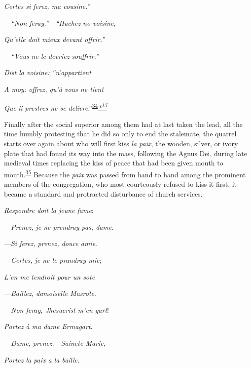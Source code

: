 \emph{Certes si ferez, ma cousine.''}

---\emph{``Non feray.''}---\emph{``Huchez no voisine},

\emph{Qu'elle doit mieux devant offrir.''}

---\emph{``Vous ne le devriez souffrir.''}

\emph{Dist la voisine: ``n'appartient}

\emph{A moy: offrez, qu'à vous ne tient}

\emph{Que li prestres ne se
delivre}.''\textsuperscript{\protect\hypertarget{09_Chapter_Two__THE_CRAVING_FOR_A_M.xhtmlux5cux23id_2019}{\protect\hyperlink{23_NOTES.xhtmlux5cux23id_2020}{34}}}\emph{\protect\hypertarget{09_Chapter_Two__THE_CRAVING_FOR_A_M.xhtmlux5cux23id_2437}{\protect\hyperlink{23_NOTES.xhtmlux5cux23id_2438}{*\textsuperscript{15}}}}

Finally after the social superior among them had at last taken the lead,
all the time humbly protesting that he did so only to end the stalemate,
the quarrel starts over again about who will first kiss \emph{la paix},
the wooden, silver, or ivory plate that had found its way into the mass,
following the Agnus Dei, during late medieval times replacing the kiss
of peace that had been given mouth to
mouth.\textsuperscript{\protect\hypertarget{09_Chapter_Two__THE_CRAVING_FOR_A_M.xhtmlux5cux23id_2017}{\protect\hyperlink{23_NOTES.xhtmlux5cux23id_2018}{35}}}
Because the \emph{paix} was passed from hand to hand among the prominent
members of the congregation, who most courteously refused
\protect\hypertarget{09_Chapter_Two__THE_CRAVING_FOR_A_M.xhtmlux5cux23page_49}{}{}to
kiss it first, it became a standard and protracted disturbance of church
services.

\emph{Respondre doit la jeune fame}:

---\emph{Prenez, je ne prendray pas, dame}.

---\emph{Si ferez, prenez, douce amie}.

---\emph{Certes, je ne le prandray mie};

\emph{L'en me tendroit pour un sote}

---\emph{Baillez, damoiselle Masrote}.

---\emph{Non feray, Jhesucrist m'en gart}!

\emph{Portez à ma dame Ermagart}.

---\emph{Dame, prenez}.---\emph{Saincte Marie},

\emph{Portez la paix a la baille}.

